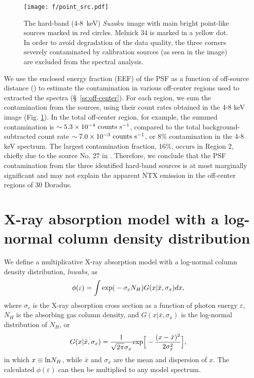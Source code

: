 \documentclass[usenatbib]{mnras}
\def\xs{30 Doradus}
\def\suzaku{{\sl Suzaku}}
\begin{document}
\begin{figure}%
\texttt{[image: f/point\_src.pdf]}
\caption{The hard-band (4-8~keV) \suzaku\ image with main bright point-like sources marked in red circles. Melnick 34 is marked in a yellow dot. In order to avoid degradation of the data quality, the three corners severely contaminated by calibration sources (as seen in the image) are excluded from the spectral analysis.}
\label{f:point}
\end{figure}

We use the enclosed energy fraction (EEF) of the PSF as a function of off-source distance (\citealt{Serlemitsos}) to estimate the contamination in various off-center regions used to extracted the spectra (\S~\ref{ss:off-center}). For each region, we sum the contamination from the sources, using their count rates obtained in the 4-8 keV image (Fig. \ref{f:point}). In the total off-center region, for example, the summed contamination is $\sim 5.3 \times 10^{-4} {\rm~counts~s^{-1}}$, compared to the total background-subtracted count rate $\sim 7.0 \times 10^{-3} {\rm~ counts~s^{-1}}$, or 8\% contamination in the 4-8 keV spectrum. The largest contamination fraction, 16\%, occurs in Region 2, chiefly due to the source No. 27 in \citet{Townsley2}. Therefore, we conclude that the PSF contamination from the three identified hard-band sources is at most marginally significant and may not explain the apparent NTX emission in the off-center regions of \xs.  

\section{X-ray absorption model with a log-normal column density distribution}
\label{a:impl-lnnh}
We define a multiplicative X-ray absorption model with a log-normal column density distribution, {\sl lnwabs}, as 
\begin{equation}
\phi(\varepsilon) = \int {\rm exp(}-\sigma_{\varepsilon} N_{H})G(x| \bar{x},\sigma_{x}) dx,
 \label{e:impl-lnnh}
\end{equation}
where $\sigma_{\varepsilon}$ is the X-ray absorption cross section as a function of photon energy $\varepsilon$, $N_{H}$ is the absorbing gas column density, and $G(x| \bar{x},\sigma_{x})$ is the log-normal distribution of $N_{H}$, or
\begin{equation}
  G(x|\bar{x},\sigma_x)=\dfrac{1}{\sqrt{2\pi } \sigma_x} {\rm exp}\Big[-\dfrac{(x - \bar{x})^2}{2\sigma_x^2}\Big],
  \label{e:log-nh}
\end{equation}
in which  $x \equiv {\rm ln} N_{H}$,  while $\bar{x}$ and  $\sigma_x$ are the mean and dispersion of $x$.
The calculated $\phi(\varepsilon) $ can then be multiplied to any model spectrum.
\end{document}
